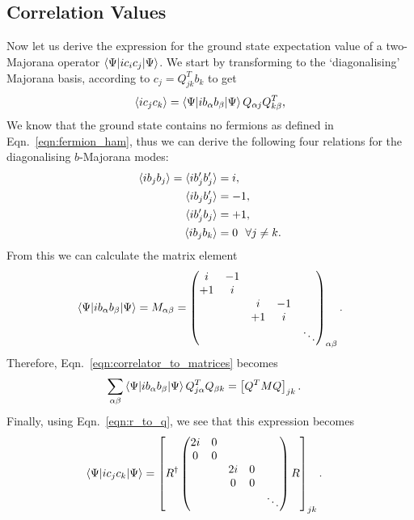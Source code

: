 \subsection{Correlation Values}

Now let us derive the expression for the ground state expectation value of a two-Majorana operator $\braket{\Psi |i c_i c_j|\Psi }$. We start by transforming to the `diagonalising' Majorana basis, according to $c_j = Q^T_{jk} b_k$ to get
\begin{align} \label{eqn:correlator_to_matrices}
    \langle i c_j c_k \rangle = \braket{\Psi |i b_\alpha  b_\beta | \Psi} 
    Q_{\alpha j} Q^T_{k \beta} ,
\end{align}
We know that the ground state contains no fermions as defined in Eqn.~\ref{eqn:fermion_ham}, thus we can derive the following four relations for the diagonalising $b$-Majorana modes: 
\begin{align}
    \braket{i b_j b_j } = \braket{i b'_j b'_j }  &= i, \\
    \braket{i b_j b'_j } &= -1, \\
    \braket{i b'_j b_j } &= +1, \\
    \braket{i b_j b_k } &= 0 \ \ \forall j \neq k.
\end{align}
From this we can calculate the matrix element
\begin{align}
    \braket{\Psi |i b_\alpha  b_\beta | \Psi} = M_{\alpha \beta} = \begin{pmatrix}
        i & -1 & &  \\
        +1 & i& & \\
        & & i & -1 & \\
        & & +1 & i & \\
        & &  & & \ddots \\
    \end{pmatrix}_{\alpha \beta}.
\end{align} 
Therefore, Eqn.~\ref{eqn:correlator_to_matrices} becomes
\begin{align}
\begin{aligned}
    \sum_{\alpha \beta} 
    \braket{\Psi |i b_\alpha  b_\beta | \Psi} 
    Q^T_{ j \alpha } Q _{ \beta k} 
    &= 
    \left[
    Q^T M Q
    \right]_{jk}.
\end{aligned}
\end{align}
Finally, using Eqn.~\ref{eqn:r_to_q}, we see that this expression becomes  
\begin{align}
    \begin{aligned}
        \braket{\Psi |i c_j  c_k | \Psi} 
        &= 
        \left[
        R^\dag \begin{pmatrix}
            2i & 0 & &  \\
            0 & 0& & \\
            & & 2i& 0 & \\
            & & 0 & 0 & \\
            & &  & & \ddots \\
        \end{pmatrix}R
        \right]_{jk}.
    \end{aligned}
    \end{align}
